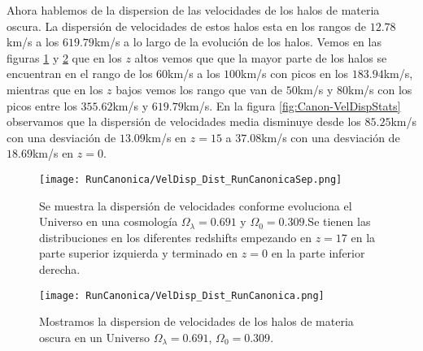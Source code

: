 Ahora hablemos de la dispersion de las velocidades de los halos de materia oscura. La dispersión de velocidades de estos halos esta en los rangos de $12.78$km/s a los $619.79$km/s a lo largo de la evolución de los halos. Vemos en las figuras \ref{fig:Canon-VelDispDistSep} y \ref{fig:Canon-VelDispDist} que en los $z$ altos vemos que que la mayor parte de los halos se encuentran en el rango de los $60$km/s a los $100$km/s con picos en los $183.94$km/s, mientras que en los $z$ bajos vemos los rango que van de $50$km/s y $80$km/s con los picos entre los $355.62$km/s y $619.79$km/s. En la figura \ref{fig:Canon-VelDispStats} observamos que la dispersión de velocidades media disminuye desde los $85.25$km/s con una desviación de $13.09$km/s en $z=15$ a $37.08$km/s con una desviación de $18.69$km/s en $z=0$.


\begin{figure}[H]
    \centering
    \texttt{[image: RunCanonica/VelDisp\_Dist\_RunCanonicaSep.png]}
    \caption[Dispersión de velocidades en la evolución de un Universo $\Omega_\lambda = 0.691 $, $\Omega_0 = 0.309$]{\footnotesize Se muestra la dispersión de velocidades conforme evoluciona el Universo en una cosmología $\Omega_\lambda = 0.691 $ y $\Omega_0 = 0.309$.Se tienen las distribuciones en los diferentes redshifts empezando en $z=17$ en la parte superior izquierda y terminado en $z=0$ en la parte inferior derecha.}
    \label{fig:Canon-VelDispDistSep}
\end{figure}

\begin{figure}[H]
    \centering
    \texttt{[image: RunCanonica/VelDisp\_Dist\_RunCanonica.png]}
    \caption[Distribución de la dispersión de velocidades de un Universo $\Omega_\lambda = 0.691 $, $\Omega_0 = 0.309$]{\footnotesize Mostramos la dispersion de velocidades de los halos de materia oscura en un Universo $\Omega_\lambda = 0.691 $, $\Omega_0 = 0.309$.}
    \label{fig:Canon-VelDispDist}
\end{figure}

